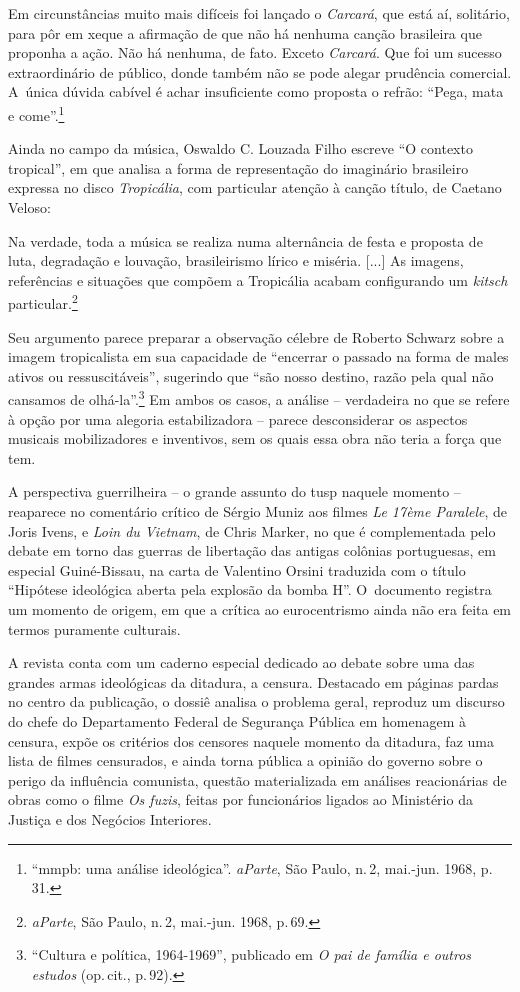 {\startblockquote
Em circunstâncias muito mais difíceis foi lançado o {\it Carcará}, que
está aí, solitário, para pôr em xeque a afirmação de que não há nenhuma
canção brasileira que proponha a ação. Não há nenhuma, de fato. Exceto
{\it Carcará}. Que foi um sucesso extraordinário de público, donde
também não se pode alegar prudência comercial. A~única dúvida cabível é
achar insuficiente como proposta o refrão: “Pega, mata e
come”.\footnote{“{\sc mmpb}: uma análise ideológica”. {\it aParte}, São Paulo,
  n.\,2, mai.-jun. 1968, p.\,31.}
\stopblockquote

Ainda no campo da música, Oswaldo C. Louzada Filho escreve “O
contexto tropical”, em que analisa a forma de representação do
imaginário brasileiro expressa no disco {\it Tropicália}, com particular
atenção à canção título, de Caetano Veloso:

\startblockquote
Na verdade, toda a música se realiza numa alternância de festa e
proposta de luta, degradação e louvação, brasileirismo lírico e miséria.
{[}...{]} As imagens, referências e situações que compõem a Tropicália
acabam configurando um {\it kitsch} particular.\footnote{{\it aParte},
  São Paulo, n.\,2, mai.-jun. 1968, p.\,69.}
\stopblockquote

Seu argumento parece preparar a observação célebre de Roberto Schwarz
sobre a imagem tropicalista em sua
capacidade de “encerrar o passado na forma de males ativos ou
ressuscitáveis”, sugerindo que “são nosso destino, razão pela qual não
cansamos de olhá-la”.\footnote{“Cultura e política, 1964-1969”,
publicado em {\it O pai de família e outros estudos}
  (op.\,cit., p.\,92).} Em ambos os casos, a
análise -- verdadeira no que se refere à opção por uma alegoria
estabilizadora -- parece desconsiderar os aspectos musicais
mobilizadores e inventivos, sem os quais essa obra não teria a força que
tem.

A perspectiva guerrilheira -- o grande assunto do {\sc tusp} naquele momento --
reaparece no comentário crítico de Sérgio Muniz aos filmes {\it Le 17ème
Paralele}, de Joris Ivens, e {\it Loin du Vietnam}, de Chris Marker, no
que é complementada pelo debate em torno das guerras de libertação das
antigas colônias portuguesas, em especial Guiné-Bissau, na carta de
Valentino Orsini traduzida com o título “Hipótese ideológica aberta
pela explosão da bomba H”. O~documento registra um momento de origem, em
que a crítica ao eurocentrismo ainda não era feita em termos puramente
culturais.

A revista conta com um caderno especial dedicado ao debate sobre uma das
grandes armas ideológicas da ditadura, a censura. Destacado em páginas
pardas no centro da publicação, o dossiê analisa o problema geral,
reproduz um discurso do chefe do Departamento Federal de Segurança
Pública em homenagem à censura, expõe os critérios dos censores naquele
momento da ditadura, faz uma lista de filmes censurados, e ainda torna
pública a opinião do governo sobre o perigo da influência comunista,
questão materializada em análises reacionárias de obras como o filme
{\it Os fuzis}, feitas por funcionários ligados ao Ministério da Justiça
e dos Negócios Interiores.

}
